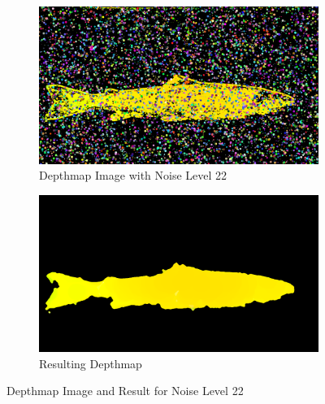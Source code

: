 \begin{figure}[H]
    \centering
    \begin{subfigure}{0.5\textwidth}
        \centering
        \includegraphics[width=.95\linewidth]{images/results/noise/noise63_22}
        \caption{Depthmap Image with Noise Level 22} 
        \label{fig:image_noise_level_22}
    \end{subfigure}%
    \begin{subfigure}{0.5\textwidth}
        \centering
        \includegraphics[width=.95\linewidth]{images/results/noise/filternoise63_22}
        \caption{Resulting Depthmap} 
        \label{fig:filter_noise_level_22}
    \end{subfigure}
    \caption{Depthmap Image and Result for Noise Level 22}
    \label{fig:noise_level_22}
\end{figure}


